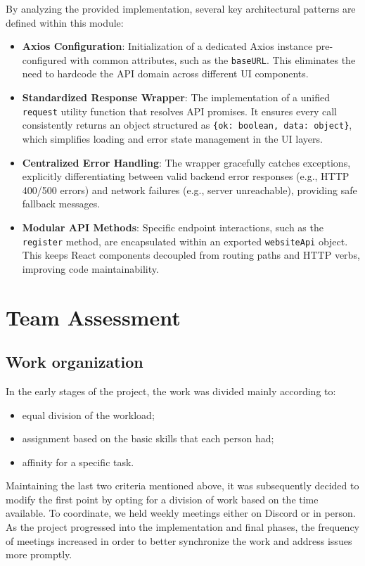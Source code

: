 \documentclass[12pt, a4paper]{article}
\begin{document}
By analyzing the provided implementation, several key architectural patterns are defined within this module:
\begin{itemize}
    \item \textbf{Axios Configuration}: Initialization of a dedicated Axios instance pre-configured with common attributes, such as the \texttt{baseURL}. This eliminates the need to hardcode the API domain across different UI components.
    \item \textbf{Standardized Response Wrapper}: The implementation of a unified \texttt{request} utility function that resolves API promises. It ensures every call consistently returns an object structured as \texttt{\{ok: boolean, data: object\}}, which simplifies loading and error state management in the UI layers.
    \item \textbf{Centralized Error Handling}: The wrapper gracefully catches exceptions, explicitly differentiating between valid backend error responses (e.g., HTTP 400/500 errors) and network failures (e.g., server unreachable), providing safe fallback messages.
    \item \textbf{Modular API Methods}: Specific endpoint interactions, such as the \texttt{register} method, are encapsulated within an exported \texttt{websiteApi} object. This keeps React components decoupled from routing paths and HTTP verbs, improving code maintainability.
\end{itemize}
\section{Team Assessment}

\subsection{Work organization}

In the early stages of the project, the work was divided mainly according to:

\begin{itemize}
    \item equal division of the workload;
    \item assignment based on the basic skills that each person had;
    \item affinity for a specific task.
\end{itemize}

Maintaining the last two criteria mentioned above, it was subsequently decided to modify the first point by opting for a division of work based on the time available. To coordinate, we held weekly meetings either on Discord or in person. As the project progressed into the implementation and final phases, the frequency of meetings increased in order to better synchronize the work and address issues more promptly.
\end{document}
